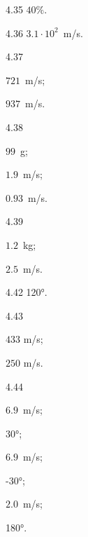 \begin{Solution}{4.{35}}
		$40\%$.
	
\end{Solution}
\begin{Solution}{4.{36}}
		$3.1 \cdot 10^2$~m/s.
	
\end{Solution}
\begin{Solution}{4.{37}}
	\begin{enumerate*}[label=(\alph*)]
		\item $721$~m/s;
		\item $937$~m/s.
	\end{enumerate*}
	
\end{Solution}
\begin{Solution}{4.{38}}
		\begin{enumerate*}[label=(\alph*)]
			\item $99$~g;
			\item $1.9$~m/s;
			\item $0.93$~m/s.
		\end{enumerate*}
	
\end{Solution}
\begin{Solution}{4.{39}}
		\begin{enumerate*}[label=(\alph*)]
			\item $1.2$~kg;
			\item $2.5$~m/s.
		\end{enumerate*}
	
\end{Solution}
\begin{Solution}{4.{42}}
		\ang{120}.
	
\end{Solution}
\begin{Solution}{4.{43}}
		\begin{enumerate*}[label=(\alph*)]
			\item $433$ m/s;
			\item $250$ m/s.
		\end{enumerate*}	
	
\end{Solution}
\begin{Solution}{4.{44}}
		\begin{enumerate*}[label=(\alph*)]
			\item $6.9$~m/s;
			\item \ang{30};
			\item $6.9$~m/s;
			\item \ang{-30};
			\item $2.0$~m/s;
			\item \ang{180}.
		\end{enumerate*}
	
\end{Solution}
